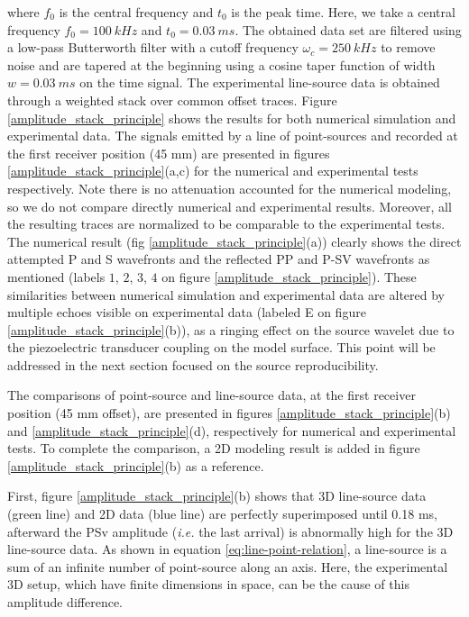 \documentclass[manuscript,revised]{geophysics}
\begin{document}
\noindent where $f_{0}$ is the central frequency and $t_{0}$ is the peak time. Here, we take a central frequency $f_{0}=100\ kHz$ and $t_{0}=0.03\ ms$. The obtained data set are filtered using a low-pass Butterworth filter with a cutoff frequency $\omega_{c}=250\ kHz$ to remove noise and are tapered at the beginning using a cosine taper function of width $w=0.03\ ms$ on the time signal. The experimental line-source data is obtained through a weighted stack over common offset traces. Figure \ref{amplitude_stack_principle} shows the results for both numerical simulation and experimental data. The signals emitted by a line of point-sources and recorded at the first receiver position (45 mm) are presented in figures \ref{amplitude_stack_principle}(a,c) for the numerical and experimental tests respectively.  Note there is no attenuation accounted for the numerical modeling, so we do not compare directly numerical and experimental results. Moreover, all the resulting traces are normalized to be comparable to the experimental tests. The numerical result (fig \ref{amplitude_stack_principle}(a)) clearly shows the direct attempted P and S wavefronts and the reflected PP and P-SV wavefronts as mentioned (labels $1$, $2$, $3$, $4$ on figure \ref{amplitude_stack_principle}). These similarities between numerical simulation and experimental data are altered by multiple echoes visible on experimental data (labeled E on figure \ref{amplitude_stack_principle}(b)), as a ringing effect on the source wavelet due to the piezoelectric transducer coupling on the model surface. This point will be addressed in the next section focused on the source reproducibility.   

\noindent The comparisons of point-source and line-source data, at the first receiver position (45 mm offset), are presented in figures \ref{amplitude_stack_principle}(b) and \ref{amplitude_stack_principle}(d), respectively for numerical and experimental tests. To complete the comparison, a 2D modeling result is added in figure \ref{amplitude_stack_principle}(b) as a reference.

\noindent First, figure \ref{amplitude_stack_principle}(b) shows that 3D line-source data (green line) and 2D data (blue line) are perfectly superimposed until 0.18 ms, afterward the PSv amplitude (\textit{i.e.} the last arrival) is abnormally high for the 3D line-source data. As shown in equation \ref{eq:line-point-relation}, a line-source is a sum of an infinite number of point-source along an axis. Here, the experimental 3D setup, which have finite dimensions in space, can be the cause of this amplitude difference.
\end{document}
